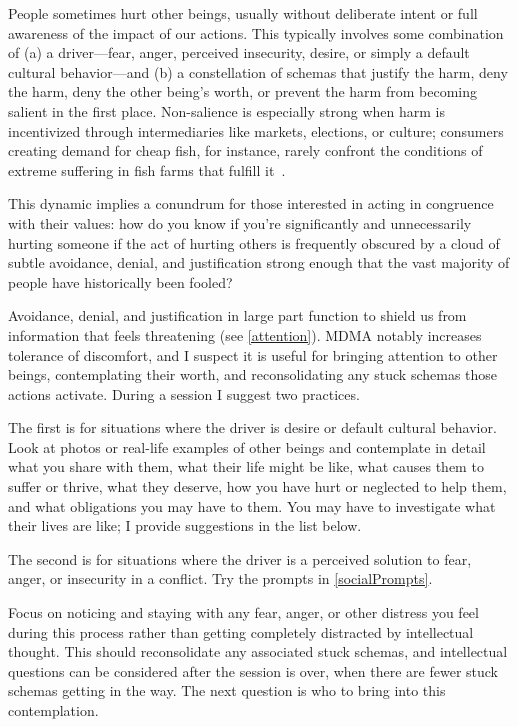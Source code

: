 \documentclass[11pt,oneside]{book}
\let\cite\parencite
\begin{document}
People sometimes hurt other beings, usually without deliberate intent or full awareness of the impact of our actions. This typically involves some combination of (a) a driver---fear, anger, perceived insecurity, desire, or simply a default cultural behavior---and (b) a constellation of schemas that justify the harm, deny the harm, deny the other being's worth, or prevent the harm from becoming salient in the first place. Non-salience is especially strong when harm is incentivized through intermediaries like markets, elections, or culture; consumers creating demand for cheap fish, for instance, rarely confront the conditions of extreme suffering in fish farms that fulfill it~\cite{singerLiberation}.

This dynamic implies a conundrum for those interested in acting in congruence with their values: how do you know if you're significantly and unnecessarily hurting someone if the act of hurting others is frequently obscured by a cloud of subtle avoidance, denial, and justification strong enough that the vast majority of people have historically been fooled?

Avoidance, denial, and justification in large part function to shield us from information that feels threatening (see \cref{attention}). MDMA notably increases tolerance of discomfort, and I suspect it is useful for bringing attention to other beings, contemplating their worth, and reconsolidating any stuck schemas those actions activate. During a session I suggest two practices.

The first is for situations where the driver is desire or default cultural behavior. Look at photos or real-life examples of other beings and contemplate in detail what you share with them, what their life might be like, what causes them to suffer or thrive, what they deserve, how you have hurt or neglected to help them, and what obligations you may have to them. You may have to investigate what their lives are like; I provide suggestions in the list below.

The second is for situations where the driver is a perceived solution to fear, anger, or insecurity in a conflict. Try the prompts in \cref{socialPrompts}.

Focus on noticing and staying with any fear, anger, or other distress you feel during this process rather than getting completely distracted by intellectual thought. This should reconsolidate any associated stuck schemas, and intellectual questions can be considered after the session is over, when there are fewer stuck schemas getting in the way. The next question is who to bring into this contemplation.
\end{document}
